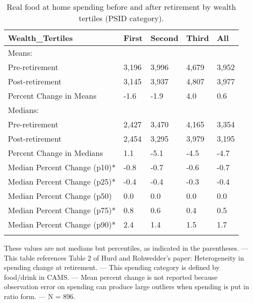 \begin{table}[tbp] \centering
{}

\caption{Real food at home spending before and after retirement by wealth tertiles (PSID category).}
\begin{tabularx}{\textwidth}{lCCCC}

\toprule
{Wealth\_Tertiles}&{First}&{Second}&{Third}&{All} \tabularnewline
\midrule\addlinespace[1.5ex]
Means:&&&& \tabularnewline
\midrule Pre-retirement&3,196&3,996&4,679&3,952 \tabularnewline
Post-retirement&3,145&3,937&4,807&3,977 \tabularnewline
Percent Change in Means&-1.6&-1.9&4.0&0.6 \tabularnewline
\midrule Medians:&&&& \tabularnewline
\midrule Pre-retirement&2,427&3,470&4,165&3,354 \tabularnewline
Post-retirement&2,454&3,295&3,979&3,195 \tabularnewline
Percent Change in Medians&1.1&-5.1&-4.5&-4.7 \tabularnewline
Median Percent Change (p10)*&-0.8&-0.7&-0.6&-0.7 \tabularnewline
Median Percent Change (p25)*&-0.4&-0.4&-0.3&-0.4 \tabularnewline
Median Percent Change (p50)&0.0&0.0&0.0&0.0 \tabularnewline
Median Percent Change (p75)*&0.8&0.6&0.4&0.5 \tabularnewline
Median Percent Change (p90)*&2.4&1.4&1.5&1.7 \tabularnewline
\bottomrule \addlinespace[1.5ex]

\end{tabularx}
\begin{flushleft}
\footnotesize *These values are not medians but percentiles, as indicated in the parentheses. \linebreak --- \linebreak This table references Table 2 of Hurd and Rohwedder's paper: Heterogeneity in spending change at retirement. \linebreak --- \linebreak This spending category is defined by food/drink in CAMS. \linebreak --- \linebreak Mean percent change is not reported because observation error on spending can produce large outliers when spending is put in ratio form. \linebreak --- \linebreak N = 896.
\end{flushleft}
\end{table}
